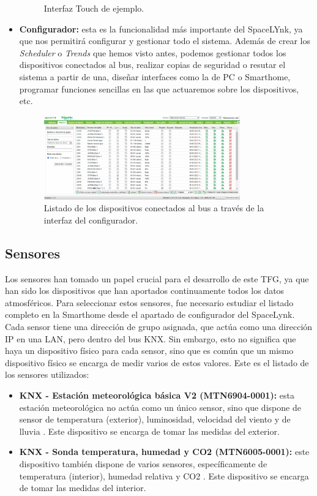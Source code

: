 \begin{itemize}
\begin{figure}[h]
        \caption{Interfaz Touch de ejemplo.}
        \label{fig:interfaz_touch}
    \end{figure}
    \item \textbf{Configurador:} esta es la funcionalidad más importante del SpaceLYnk, ya que nos permitirá configurar y gestionar todo el sistema. Además de crear los \textit{Scheduler} o \textit{Trends} que hemos visto antes, podemos gestionar todos los dispositivos conectados al bus, realizar copias de seguridad o resutar el sistema a partir de una, diseñar interfaces como la de PC o Smarthome, programar funciones sencillas en las que actuaremos sobre los dispositivos, etc.
    \begin{figure}[h]
        \centering
        \includegraphics[width=0.8\textwidth, keepaspectratio]{imagenes/capitulo3/InterfazConfigurador.png}
        \caption{Listado de los dispositivos conectados al bus a través de la interfaz del configurador.}
        \label{fig:interfaz_touch}
    \end{figure}
\end{itemize}

\subsection{Sensores}

Los sensores han tomado un papel crucial para el desarrollo de este TFG, ya que han sido los dispositivos que han aportados continuamente todos los datos atmosféricos. Para seleccionar estos sensores, fue necesario estudiar el listado completo en la Smarthome desde el apartado de configurador del SpaceLynk. Cada sensor tiene una dirección de grupo asignada, que actúa como una dirección IP en una LAN, pero dentro del bus KNX. Sin embargo, esto no significa que haya un dispositivo físico para cada sensor, sino que es común que un mismo dispositivo físico se encarga de medir varios de estos valores. Este es el listado de los sensores utilizados:

\begin{itemize}
    \item \textbf{KNX - Estación meteorológica básica V2 (MTN6904-0001): }esta estación meteorológica no actúa como un único sensor, sino que dispone de sensor de temperatura (exterior), luminosidad, velocidad del viento y de lluvia \cite{cap3_2}. Este dispositivo se encarga de tomar las medidas del exterior.
    \item \textbf{KNX - Sonda temperatura, humedad y CO2 (MTN6005-0001): }este dispositivo también dispone de varios sensores, específicamente de temperatura (interior), humedad relativa y CO2 \cite{cap3_3}. Este dispositivo se encarga de tomar las medidas del interior.
\end{itemize}

